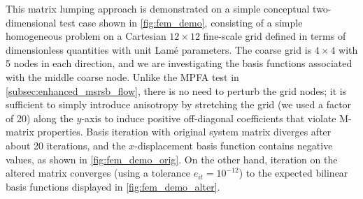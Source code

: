 This matrix lumping approach is demonstrated on a simple conceptual two-dimensional test case shown in \autoref{fig:fem_demo}, consisting of a simple homogeneous problem on a Cartesian $12 \times 12$ fine-scale grid defined in terms of dimensionless quantities with unit Lam\'{e} parameters.  The coarse grid is $4 \times 4$ with 5 nodes in each direction, and we are investigating the basis functions associated with the middle coarse node.   Unlike the MPFA test in \autoref{subsec:enhanced_msrsb_flow}, there is no need to perturb the grid nodes; it is sufficient to simply introduce anisotropy by stretching the grid (we used a factor of 20) along the $y$-axis to induce positive off-diagonal coefficients that violate M-matrix properties.   Basis iteration with original system matrix diverges after about 20 iterations, and the $x$-displacement basis function contains negative values, as shown in \autoref{fig:fem_demo_orig}.   On the other hand, iteration on the altered matrix converges (using a tolerance $e_{it} = 10^{-12}$) to the expected bilinear basis functions displayed in \autoref{fig:fem_demo_alter}.

